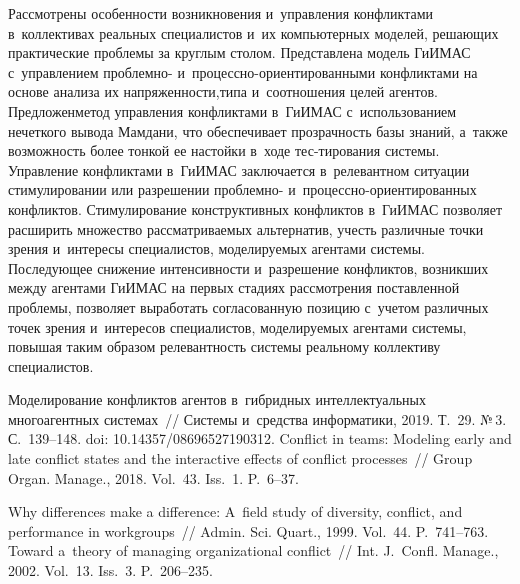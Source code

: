 \begin{multicols}{2}
  Рассмотрены особенности возникновения и~управления конфликтами 
в~коллективах реальных специалистов и~их компьютерных моделей, 
решающих практические проб\-ле\-мы за круглым столом. Представлена модель 
\mbox{ГиИМАС} с~управ\-ле\-ни\-ем проб\-лем\-но-  
и~про\-цес\-сно-ори\-ен\-ти\-ро\-ван\-ны\-ми конфликтами на основе анализа их 
напряженности,\linebreak типа и~соотношения целей агентов. Предложен\linebreak метод 
управления конфликтами в~\mbox{ГиИМАС} с~использованием нечеткого 
вывода Мамдани, что обеспечивает прозрачность базы знаний, а~также\linebreak 
воз\-мож\-ность более тонкой ее настойки в~ходе тес-\linebreak тирования сис\-те\-мы. 
Управ\-ле\-ние конф\-лик\-та\-ми в~\mbox{ГиИМАС} заключается в~релевантном 
ситуа\-ции стимулировании или разрешении проб\-лем\-но-  
и~про\-цес\-сно-ори\-ен\-ти\-ро\-ван\-ных конфликтов. Стимулирование 
конструктивных \mbox{конфликтов} в~\mbox{ГиИМАС} позволяет расширить 
множество рас\-смат\-ри\-ва\-емых альтернатив, учесть различные точки зрения 
и~интересы специалистов, мо\-де\-ли\-ру\-емых агентами сис\-те\-мы. Последующее 
снижение ин\-тен\-сив\-ности и~разрешение конфликтов, возникших между 
агентами \mbox{ГиИМАС} на первых стадиях рас\-смот\-ре\-ния по\-став\-лен\-ной 
проблемы, поз\-во\-ля\-ет выработать согласованную позицию с~учетом различных 
точек зрения и~интересов специалистов, мо\-де\-ли\-ру\-емых агентами сис\-те\-мы, 
повышая таким образом релевантность сис\-те\-мы реальному коллективу 
специалистов.
  
{\small\frenchspacing
 {%
 \begin{thebibliography}{99}
   Моделирование конфликтов агентов в~гиб\-рид\-ных 
интеллектуальных многоагентных сис\-те\-мах~// Сис\-те\-мы и~средства информатики, 2019. 
Т.~29. №\,3. С.~139--148. doi: 10.14357/08696527190312.
   Conflict in teams: Modeling 
early and late conflict states and the interactive effects of conflict processes~// Group  
Organ. Manage., 2018. Vol.~43. Iss.~1. P.~6--37.

   Why differences make a difference: A~field 
study of diversity, conflict, and performance in workgroups~// Admin. Sci. Quart., 
1999. Vol.~44. P.~741--763.
   Toward a~theory of managing organizational conflict~// Int. J.~Confl. 
Manage., 2002. Vol.~13. Iss.~3. P.~206--235.


\end{thebibliography}}}
\end{multicols}
